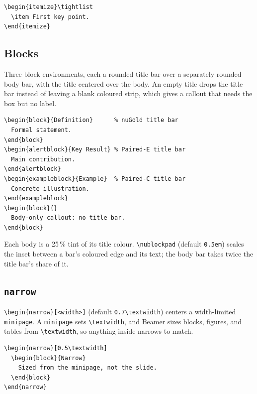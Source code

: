 \documentclass[a4paper,11pt]{article}
\begin{document}
\begin{lstlisting}
\begin{itemize}\tightlist
  \item First key point.
\end{itemize}
\end{lstlisting}

\subsection{Blocks}

Three block environments, each a rounded title bar over a separately rounded
body bar, with the title centered over the body.  An empty title drops the
title bar instead of leaving a blank coloured strip, which gives a callout that
needs the box but no label.

\begin{lstlisting}
\begin{block}{Definition}      % nuGold title bar
  Formal statement.
\end{block}
\begin{alertblock}{Key Result} % Paired-E title bar
  Main contribution.
\end{alertblock}
\begin{exampleblock}{Example}  % Paired-C title bar
  Concrete illustration.
\end{exampleblock}
\begin{block}{}
  Body-only callout: no title bar.
\end{block}
\end{lstlisting}

Each body is a 25\,\% tint of its title colour.  \verb|\nublockpad| (default
\texttt{0.5em}) scales the inset between a bar's coloured edge and its text;
the body bar takes twice the title bar's share of it.

\subsection{\texttt{narrow}}

\verb|\begin{narrow}[<width>]| (default \verb|0.7\textwidth|) centers a
width-limited \texttt{minipage}.  A \texttt{minipage} sets \verb|\textwidth|,
and Beamer sizes blocks, figures, and tables from \verb|\textwidth|, so
anything inside narrows to match.

\begin{lstlisting}
\begin{narrow}[0.5\textwidth]
  \begin{block}{Narrow}
    Sized from the minipage, not the slide.
  \end{block}
\end{narrow}
\end{lstlisting}
\end{document}

